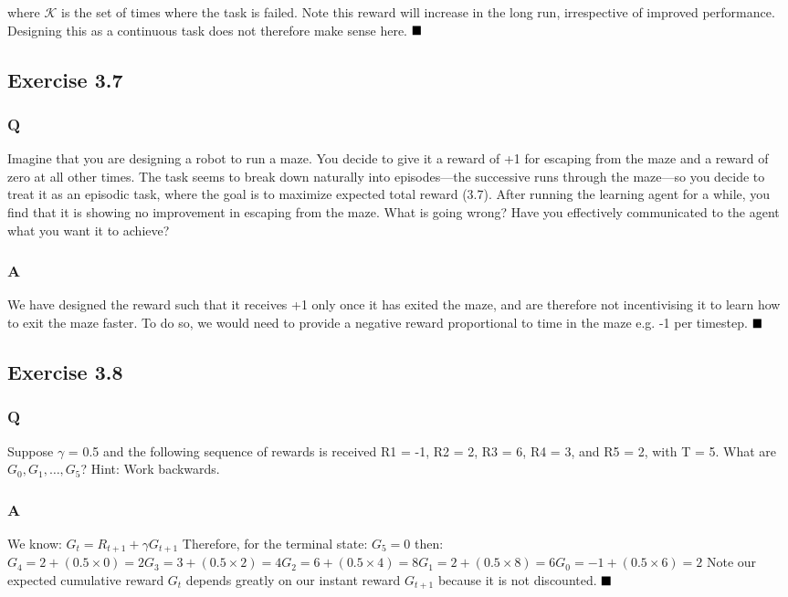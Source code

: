 where \(\mathcal{K}\) is the set of times where the task is failed. Note this reward will increase in the long run, irrespective of improved performance. Designing this as a continuous task does not therefore make sense here.
$
\hfill \blacksquare
$

\subsection{Exercise 3.7}
\subsubsection*{Q}
Imagine that you are designing a robot to run a maze. You decide to give it a reward of +1 for escaping from the maze and a reward of zero at all other times. The task seems to break down naturally into episodes—the successive runs through the maze—so you decide to treat it as an episodic task, where the goal is to maximize expected total reward (3.7). After running the learning agent for a while, you find that it is showing no improvement in escaping from the maze. What is going  wrong? Have you effectively communicated to the agent what you want it to achieve?

\subsubsection*{A}
We have designed the reward such that it receives +1 only once it has exited the maze, and are therefore not incentivising it to learn how to exit the maze faster. To do so, we would need to provide a negative reward proportional to time in the maze e.g. -1 per timestep.
$
\hfill \blacksquare
$

\subsection{Exercise 3.8}
\subsubsection*{Q}
Suppose \(\gamma\) = 0.5 and the following sequence of rewards is received R1 = -1, R2 = 2, R3 = 6, R4 = 3, and R5 = 2, with T = 5. What are \(G_0, G_1, \ldots, G_5\)? Hint: Work backwards.

\subsubsection*{A}
We know:
$
G_t = R_{t+1} + \gamma G_{t+1}
$
Therefore, for the terminal state:
$
G_5 = 0
$
then:
$
G_4 = 2 +  (0.5 \times 0) = 2
G_3 = 3 + (0.5 \times 2) = 4
G_2 = 6 + (0.5 \times 4) = 8
G_1 = 2 + (0.5 \times 8) = 6
G_0 = -1 + (0.5 \times 6) = 2
$
Note our expected cumulative reward \(G_t\) depends greatly on our instant reward \(G_{t+1}\) because it is not  discounted.
$
\hfill \blacksquare
$

